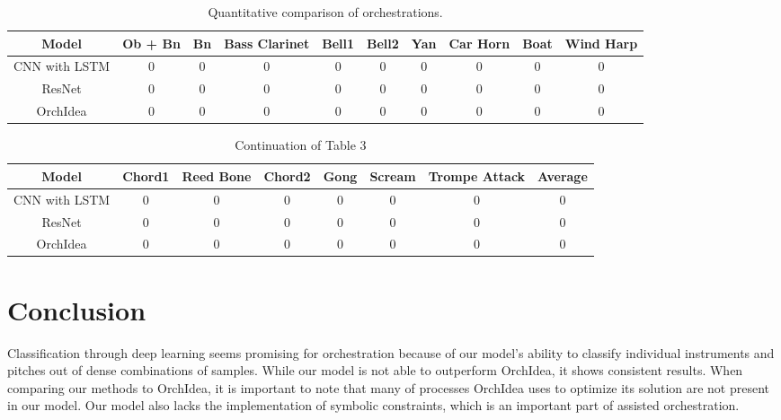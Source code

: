 \documentclass{article}
\begin{document}
\begin{table}
  \begin{center}
    \label{orch_eval}
    \begin{tabular}{|c|c|c|c|c|c|c|c|c|c|} 
    	  \hline
      \textbf{Model} & \textbf{Ob + Bn} & \textbf{Bn} & \textbf{Bass Clarinet} & \textbf{Bell1} & \textbf{Bell2} & \textbf{Yan} & \textbf{Car Horn} & \textbf{Boat} & \textbf{Wind Harp} \\
      \hline
      CNN with LSTM & 0 & 0 & 0 & 0 & 0 & 0 & 0 & 0 & 0\\
      \hline
      ResNet & 0 & 0 & 0 & 0 & 0 & 0 & 0 & 0 & 0 \\
      \hline
      OrchIdea & 0 & 0 & 0 & 0 & 0 & 0 & 0 & 0 & 0  \\
      \hline
    \end{tabular}
  \end{center}
  \caption{Quantitative comparison of orchestrations.}
\end{table}
\begin{table}
  \begin{center}
    \label{orch_eval2}
    \begin{tabular}{|c|c|c|c|c|c|c|c|} 
    	  \hline
      \textbf{Model} & \textbf{Chord1} & \textbf{Reed Bone} & \textbf{Chord2} & \textbf{Gong} & \textbf{Scream} & \textbf{Trompe Attack} & \textbf{Average}  \\
      \hline
      CNN with LSTM & 0 & 0 & 0 & 0 & 0 & 0 & 0 \\
      \hline
      ResNet & 0 & 0 & 0 & 0 & 0 & 0 & 0 \\
      \hline
      OrchIdea & 0 & 0 & 0 & 0 & 0 & 0 & 0   \\
      \hline
    \end{tabular}
  \end{center}
  \caption{Continuation of Table 3}
\end{table}

\section{Conclusion}

Classification through deep learning seems promising for orchestration because of our model's ability to classify individual instruments and pitches out of dense combinations of samples. While our model is not able to outperform OrchIdea, it shows consistent results. When comparing our methods to OrchIdea, it is important to note that many of processes OrchIdea uses to optimize its solution are not present in our model. Our model also lacks the implementation of symbolic constraints, which is an important part of assisted orchestration.\\
\end{document}
